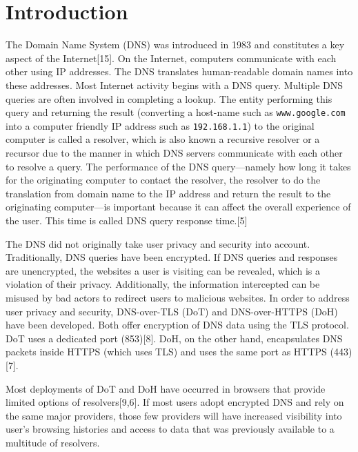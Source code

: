 \section{Introduction}\label{sec:intro}

The Domain Name System (DNS) was introduced in 1983 and constitutes a key aspect of the Internet[15].
On the Internet, computers communicate with each other using IP addresses.
The DNS translates human-readable domain names into these addresses.
Most Internet activity begins with a DNS query.
Multiple DNS queries are often involved in completing a lookup.
The entity performing this query and returning the result (converting a host-name such as \texttt{www.google.com} into a computer friendly IP address such as \texttt{192.168.1.1}) to the original computer is called a resolver, which is also known a recursive resolver or a recursor due to the  manner in which DNS servers communicate with each other to resolve a query.
The performance of the DNS query—namely how long it takes for the originating computer to contact the resolver, the resolver to do the translation from domain name to the IP address and return the result to the originating computer—is important because it can affect the overall experience of the user.
This time is called DNS query response time.[5]

The DNS did not originally take user privacy and security into account.
Traditionally, DNS queries have been encrypted.
If DNS queries and responses are unencrypted, the websites a user is visiting can be revealed, which is a violation of their privacy.
Additionally, the information intercepted can be misused by bad actors to redirect users to malicious websites.
In order to address user privacy and security, DNS-over-TLS (DoT) and DNS-over-HTTPS (DoH) have been developed.
Both offer encryption of DNS data using the TLS protocol.
DoT uses a dedicated port (853)[8].
DoH, on the other hand, encapsulates DNS packets inside HTTPS (which uses TLS) and uses the same port as HTTPS (443)[7].

Most deployments of DoT and DoH have occurred in browsers that provide limited options of resolvers[9,6].
If most users adopt encrypted DNS and rely on the same major providers, those few providers will have increased visibility into user's browsing histories and access to data that was previously available to a multitude of resolvers.

